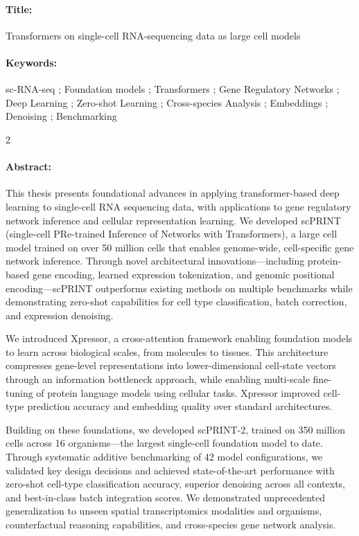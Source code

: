 \begin{mdframed}
\vspace{-.25cm}
\paragraph*{Title:} Transformers on single-cell RNA-sequencing
data as large cell models

\begin{small}
\vspace{-.25cm}
\paragraph*{Keywords:} sc-RNA-seq ; Foundation models ; Transformers ; Gene Regulatory Networks ; Deep Learning ; Zero-shot Learning ; Cross-species Analysis ; Embeddings ; Denoising ; Benchmarking

\vspace{-.5cm}
\setlength{\columnsep}{12pt} %
\begin{multicols}{2}
\paragraph*{Abstract:}
This thesis presents foundational advances in applying transformer-based deep learning to single-cell RNA sequencing data, with applications to gene regulatory network inference and cellular representation learning. We developed scPRINT (single-cell PRe-trained Inference of Networks with Transformers), a large cell model trained on over 50 million cells that enables genome-wide, cell-specific gene network inference. Through novel architectural innovations—including protein-based gene encoding, learned expression tokenization, and genomic positional encoding—scPRINT outperforms existing methods on multiple benchmarks while demonstrating zero-shot capabilities for cell type classification, batch correction, and expression denoising.

We introduced Xpressor, a cross-attention framework enabling foundation models to learn across biological scales, from molecules to tissues. This architecture compresses gene-level representations into lower-dimensional cell-state vectors through an information bottleneck approach, while enabling multi-scale fine-tuning of protein language models using cellular tasks. Xpressor improved cell-type prediction accuracy and embedding quality over standard architectures.

Building on these foundations, we developed scPRINT-2, trained on 350 million cells across 16 organisms—the largest single-cell foundation model to date. Through systematic additive benchmarking of 42 model configurations, we validated key design decisions and achieved state-of-the-art performance with zero-shot cell-type classification accuracy, superior denoising across all contexts, and best-in-class batch integration scores. We demonstrated unprecedented generalization to unseen spatial transcriptomics modalities and organisms, counterfactual reasoning capabilities, and cross-species gene network analysis.


\end{multicols}
\end{small}
\end{mdframed}
